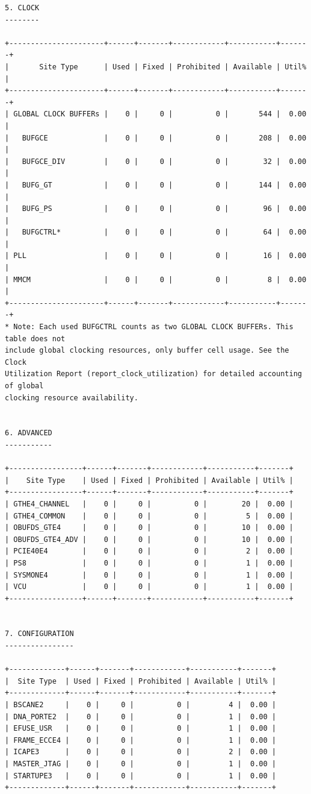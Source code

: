 \documentclass{article}
\begin{document}
\begin{lstlisting}
5. CLOCK
--------

+----------------------+------+-------+------------+-----------+-------+
|       Site Type      | Used | Fixed | Prohibited | Available | Util% |
+----------------------+------+-------+------------+-----------+-------+
| GLOBAL CLOCK BUFFERs |    0 |     0 |          0 |       544 |  0.00 |
|   BUFGCE             |    0 |     0 |          0 |       208 |  0.00 |
|   BUFGCE_DIV         |    0 |     0 |          0 |        32 |  0.00 |
|   BUFG_GT            |    0 |     0 |          0 |       144 |  0.00 |
|   BUFG_PS            |    0 |     0 |          0 |        96 |  0.00 |
|   BUFGCTRL*          |    0 |     0 |          0 |        64 |  0.00 |
| PLL                  |    0 |     0 |          0 |        16 |  0.00 |
| MMCM                 |    0 |     0 |          0 |         8 |  0.00 |
+----------------------+------+-------+------------+-----------+-------+
* Note: Each used BUFGCTRL counts as two GLOBAL CLOCK BUFFERs. This table does not 
include global clocking resources, only buffer cell usage. See the Clock 
Utilization Report (report_clock_utilization) for detailed accounting of global 
clocking resource availability.


6. ADVANCED
-----------

+-----------------+------+-------+------------+-----------+-------+
|    Site Type    | Used | Fixed | Prohibited | Available | Util% |
+-----------------+------+-------+------------+-----------+-------+
| GTHE4_CHANNEL   |    0 |     0 |          0 |        20 |  0.00 |
| GTHE4_COMMON    |    0 |     0 |          0 |         5 |  0.00 |
| OBUFDS_GTE4     |    0 |     0 |          0 |        10 |  0.00 |
| OBUFDS_GTE4_ADV |    0 |     0 |          0 |        10 |  0.00 |
| PCIE40E4        |    0 |     0 |          0 |         2 |  0.00 |
| PS8             |    0 |     0 |          0 |         1 |  0.00 |
| SYSMONE4        |    0 |     0 |          0 |         1 |  0.00 |
| VCU             |    0 |     0 |          0 |         1 |  0.00 |
+-----------------+------+-------+------------+-----------+-------+


7. CONFIGURATION
----------------

+-------------+------+-------+------------+-----------+-------+
|  Site Type  | Used | Fixed | Prohibited | Available | Util% |
+-------------+------+-------+------------+-----------+-------+
| BSCANE2     |    0 |     0 |          0 |         4 |  0.00 |
| DNA_PORTE2  |    0 |     0 |          0 |         1 |  0.00 |
| EFUSE_USR   |    0 |     0 |          0 |         1 |  0.00 |
| FRAME_ECCE4 |    0 |     0 |          0 |         1 |  0.00 |
| ICAPE3      |    0 |     0 |          0 |         2 |  0.00 |
| MASTER_JTAG |    0 |     0 |          0 |         1 |  0.00 |
| STARTUPE3   |    0 |     0 |          0 |         1 |  0.00 |
+-------------+------+-------+------------+-----------+-------+



\end{lstlisting}
\end{document}
